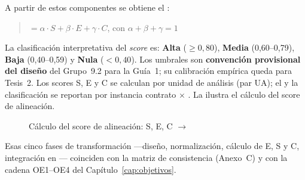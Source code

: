 A partir de estos componentes se obtiene el \AlignmentScore{}:

\begin{quote}
  \AlignmentScore{} $= \alpha \cdot S + \beta \cdot E + \gamma \cdot C$, con $\alpha + \beta +
  \gamma = 1$
\end{quote}

La clasificación interpretativa del \textit{score} es: \textbf{Alta} ($\geq 0{,}80$),
\textbf{Media} (0,60--0,79), \textbf{Baja} (0,40--0,59) y \textbf{Nula} ($< 0{,}40$). Los umbrales
son \textbf{convención provisional del diseño} del Grupo~9.2 para la Guía~1; su calibración empírica
queda para Tesis~2. Los scores S, E y C se calculan por unidad de análisis (par UA); el
\AlignmentScore{} y la clasificación se reportan por instancia contrato $\times$ \ServiceDomain{}.
La  ilustra el cálculo del score de alineación.

\begin{figure}[H]
  \centering
  \figCapThree
  \caption{Cálculo del score de alineación: S, E, C $\rightarrow$ \AlignmentScore{}}
  \label{fig:alignment-score}
\end{figure}

Esas cinco fases de transformación ---diseño, normalización, cálculo de E, S y C, integración en
\AlignmentScore{}--- coinciden con la matriz de consistencia (Anexo~C) y con la cadena OE1--OE4 del
Capítulo~\ref{cap:objetivos}.
